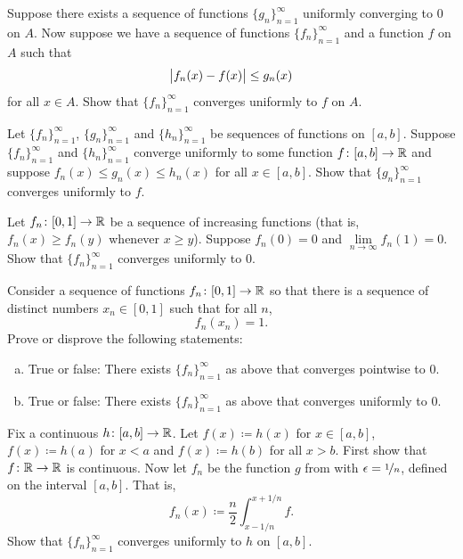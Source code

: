 \begin{exercise}
Suppose there exists a sequence of functions $\{ g_n \}_{n=1}^\infty$ uniformly
converging to $0$ on $A$.  Now suppose we have a sequence of functions
$\{ f_n \}_{n=1}^\infty$ and a function $f$ on $A$ such that
\begin{equation*}
\bigl\lvert {f_n(x) - f(x)} \bigr\rvert \leq g_n(x) 
\end{equation*}
for all $x \in A$.  Show that $\{ f_n \}_{n=1}^\infty$ converges uniformly to $f$ on $A$.
\end{exercise}

\begin{exercise}
Let $\{ f_n \}_{n=1}^\infty$, $\{ g_n \}_{n=1}^\infty$ and
$\{ h_n \}_{n=1}^\infty$ be sequences of functions on
$[a,b]$.  Suppose $\{ f_n \}_{n=1}^\infty$ and $\{ h_n \}_{n=1}^\infty$ converge uniformly to some function
$f \colon [a,b] \to {\mathbb{R}}$ and suppose $f_n(x) \leq g_n(x) \leq h_n(x)$
for all $x \in [a,b]$.  Show that $\{ g_n \}_{n=1}^\infty$ converges uniformly to $f$.
\end{exercise}

\begin{exercise}
Let $f_n \colon [0,1] \to {\mathbb{R}}$ be a sequence of increasing functions (that
is, $f_n(x) \geq f_n(y)$ whenever $x \geq y$).  Suppose $f_n(0) = 0$
and $\lim\limits_{n \to \infty} f_n(1) = 0$.  Show that
$\{ f_n \}_{n=1}^\infty$
converges uniformly to $0$.
\end{exercise}

\begin{exercise}
Consider a sequence of functions $f_n \colon [0,1] \to {\mathbb{R}}$ so that there
is a sequence of distinct numbers $x_n \in [0,1]$ such that
for all $n$,
\begin{equation*}
f_n(x_n) = 1.
\end{equation*}
Prove or disprove the following statements:
\begin{enumerate}[a)]
\item
True or false: There exists $\{ f_n \}_{n=1}^\infty$ as above that
converges pointwise to $0$.
\item
True or false: There exists $\{ f_n \}_{n=1}^\infty$ as above that
converges uniformly to $0$.
\end{enumerate}
\end{exercise}

\begin{exercise}
Fix a continuous $h \colon [a,b] \to {\mathbb{R}}$.
Let $f(x) \coloneqq h(x)$ for $x \in [a,b]$,
$f(x) \coloneqq h(a)$ for $x < a$ and $f(x) \coloneqq h(b)$ for all $x > b$.  First show
that $f \colon {\mathbb{R}} \to {\mathbb{R}}$ is continuous.
Now let $f_n$ be
the function $g$ from  with
$\epsilon = \nicefrac{1}{n}$, defined on the interval $[a,b]$.  That is,
\begin{equation*}
f_n(x) \coloneqq \frac{n}{2} \int_{x-1/n}^{x+1/n} f .
\end{equation*}
Show that $\{ f_n \}_{n=1}^\infty$ converges uniformly to $h$ on $[a,b]$.
\end{exercise}


